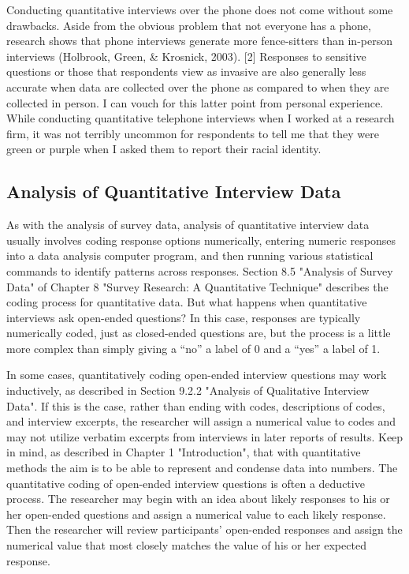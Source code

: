 Conducting quantitative interviews over the phone does not come without some drawbacks. Aside from the obvious problem that not everyone has a phone, research shows that phone interviews generate more fence-sitters than in-person interviews (Holbrook, Green, \& Krosnick, 2003). [2] Responses to sensitive questions or those that respondents view as invasive are also generally less accurate when data are collected over the phone as compared to when they are collected in person. I can vouch for this latter point from personal experience. While conducting quantitative telephone interviews when I worked at a research firm, it was not terribly uncommon for respondents to tell me that they were green or purple when I asked them to report their racial identity.

\subsection{Analysis of Quantitative Interview Data}

As with the analysis of survey data, analysis of quantitative interview data usually involves coding response options numerically, entering numeric responses into a data analysis computer program, and then running various statistical commands to identify patterns across responses. Section 8.5 "Analysis of Survey Data" of Chapter 8 "Survey Research: A Quantitative Technique" describes the coding process for quantitative data. But what happens when quantitative interviews ask open-ended questions? In this case, responses are typically numerically coded, just as closed-ended questions are, but the process is a little more complex than simply giving a “no” a label of 0 and a “yes” a label of 1.

In some cases, quantitatively coding open-ended interview questions may work inductively, as described in Section 9.2.2 "Analysis of Qualitative Interview Data". If this is the case, rather than ending with codes, descriptions of codes, and interview excerpts, the researcher will assign a numerical value to codes and may not utilize verbatim excerpts from interviews in later reports of results. Keep in mind, as described in Chapter 1 "Introduction", that with quantitative methods the aim is to be able to represent and condense data into numbers. The quantitative coding of open-ended interview questions is often a deductive process. The researcher may begin with an idea about likely responses to his or her open-ended questions and assign a numerical value to each likely response. Then the researcher will review participants’ open-ended responses and assign the numerical value that most closely matches the value of his or her expected response.

